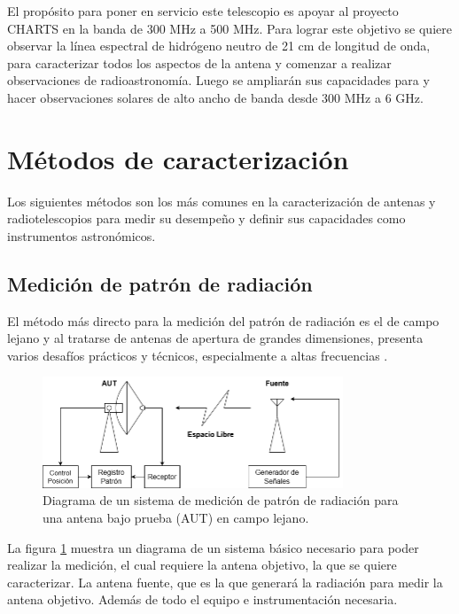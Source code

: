 El propósito para poner en servicio este telescopio es apoyar al proyecto CHARTS en la banda de 300 MHz a 500 MHz. Para lograr este objetivo se quiere observar la línea espectral de hidrógeno neutro de 21 cm de longitud de onda, para caracterizar todos los aspectos de la antena y comenzar a realizar observaciones de radioastronomía. Luego se ampliarán sus capacidades para  y hacer observaciones solares de alto ancho de banda desde 300 MHz a 6 GHz.\\

\section{Métodos de caracterización}

Los siguientes métodos son los más comunes en la caracterización de antenas y radiotelescopios para medir su desempeño y definir sus capacidades como instrumentos astronómicos.\\

\subsection{Medición de patrón de radiación}

El método más directo para la medición del patrón de radiación es el de campo lejano y al tratarse de antenas de apertura de grandes dimensiones, presenta varios desafíos prácticos y técnicos, especialmente a altas frecuencias \cite{Astudillo2014}.\\

\begin{figure}
    \centering
    \includegraphics[width = 0.8\textwidth]{img/farfielddiag}
    \caption{Diagrama de un sistema de medición de patrón de radiación para una antena bajo prueba (AUT) en campo lejano.}
    \label{fig:farfield}
\end{figure}

La figura \ref{fig:farfield} muestra un diagrama de un sistema básico necesario para poder realizar la medición, el cual requiere la antena objetivo, la que se quiere caracterizar. La antena fuente, que es la que generará la radiación para medir la antena objetivo. Además de todo el equipo e instrumentación necesaria.\\

